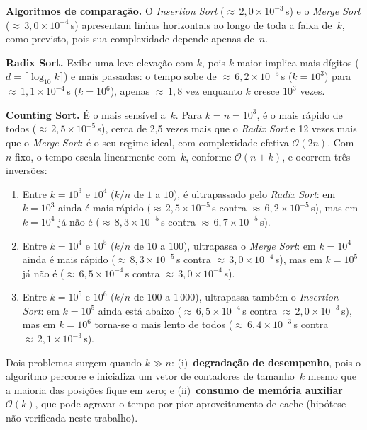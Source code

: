 \documentclass[12pt]{article}
\begin{document}
\textbf{Algoritmos de comparação.} O \textit{Insertion Sort}
(${\approx}\,2{,}0 \times 10^{-3}$\,s) e o \textit{Merge Sort}
(${\approx}\,3{,}0 \times 10^{-4}$\,s) apresentam linhas horizontais ao
longo de toda a faixa de~$k$, como previsto, pois sua complexidade depende
apenas de~$n$.

\textbf{Radix Sort.} Exibe uma leve elevação com $k$, pois $k$ maior implica
mais dígitos ($d = \lceil \log_{10} k \rceil$) e mais passadas: o tempo sobe
de ${\approx}\,6{,}2 \times 10^{-5}$\,s ($k = 10^{3}$) para
${\approx}\,1{,}1 \times 10^{-4}$\,s ($k = 10^{6}$), apenas
${\approx}\,1{,}8$ vez enquanto $k$ cresce $10^{3}$ vezes.

\textbf{Counting Sort.} É o mais sensível a~$k$. Para $k = n = 10^{3}$, é o
mais rápido de todos (${\approx}\,2{,}5 \times 10^{-5}$\,s), cerca de 2,5
vezes mais que o \textit{Radix Sort} e 12 vezes mais que o \textit{Merge
Sort}: é o seu regime ideal, com complexidade efetiva $\mathcal{O}(2n)$.
Com $n$ fixo, o tempo escala linearmente com~$k$, conforme
$\mathcal{O}(n + k)$, e ocorrem três inversões:

\begin{enumerate}
  \item Entre $k = 10^{3}$ e $10^{4}$ ($k/n$ de $1$ a $10$), é ultrapassado
        pelo \textit{Radix Sort}: em $k = 10^{3}$ ainda é mais rápido
        (${\approx}\,2{,}5 \times 10^{-5}$\,s contra
        ${\approx}\,6{,}2 \times 10^{-5}$\,s), mas em $k = 10^{4}$ já não
        é (${\approx}\,8{,}3 \times 10^{-5}$\,s contra
        ${\approx}\,6{,}7 \times 10^{-5}$\,s).
  \item Entre $k = 10^{4}$ e $10^{5}$ ($k/n$ de $10$ a $100$), ultrapassa o
        \textit{Merge Sort}: em $k = 10^{4}$ ainda é mais rápido
        (${\approx}\,8{,}3 \times 10^{-5}$\,s contra
        ${\approx}\,3{,}0 \times 10^{-4}$\,s), mas em $k = 10^{5}$ já não
        é (${\approx}\,6{,}5 \times 10^{-4}$\,s contra
        ${\approx}\,3{,}0 \times 10^{-4}$\,s).
  \item Entre $k = 10^{5}$ e $10^{6}$ ($k/n$ de $100$ a $1\,000$), ultrapassa
        também o \textit{Insertion Sort}: em $k = 10^{5}$ ainda está abaixo
        (${\approx}\,6{,}5 \times 10^{-4}$\,s contra
        ${\approx}\,2{,}0 \times 10^{-3}$\,s), mas em $k = 10^{6}$ torna-se
        o mais lento de todos (${\approx}\,6{,}4 \times 10^{-3}$\,s contra
        ${\approx}\,2{,}1 \times 10^{-3}$\,s).
\end{enumerate}

Dois problemas surgem quando $k \gg n$: (i)~\textbf{degradação de
desempenho}, pois o algoritmo percorre e inicializa um vetor de contadores
de tamanho~$k$ mesmo que a maioria das posições fique em zero; e
(ii)~\textbf{consumo de memória auxiliar} $\mathcal{O}(k)$, que pode agravar
o tempo por pior aproveitamento de cache (hipótese não verificada neste
trabalho).
\end{document}
